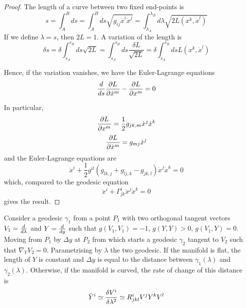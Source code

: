     \begin{proof}
        The length of a curve between two fixed end-points is 
        \begin{equation*}
            s = \int_{A}^{B} ds = \int_{A}^{B} ds \sqrt{g_{ij} \dot x^i \dot x^j} = \int_{\lambda_A}^{\lambda_B} d\lambda \sqrt{2 L(x^k, \dot x^l)}
        \end{equation*}
        If we define $\lambda = s$, then $2L = 1$. A variation of the length is 
        \begin{equation*}
            \delta s = \delta \int_{s_A}^{s_B} ds \sqrt{2L} = \int_{s_A}^{s_B} ds \frac{\delta L}{\sqrt{2L}} = \delta \int_{s_A}^{s_B} ds L(x^k, \dot x^l)
        \end{equation*}

        Hence, if the variation vanishes, we have the Euler-Lagrange equations 
        \begin{equation*}
            \frac{d}{ds} \frac{\partial L}{\partial\dot x^m} - \frac{\partial L}{\partial x^m} = 0
        \end{equation*}

        In particular, 
        \begin{equation*}
            \frac{\partial L}{\partial x^m} = \frac{1}{2} g_{jk,m} \dot x^j \dot x^k
        \end{equation*}
        \begin{equation*}
            \frac{\partial L}{\partial\dot x^m} = g_{mj} \dot x^j
        \end{equation*}
        and the Euler-Lagrange equations are 
        \begin{equation*}
            \ddot x^i + \frac{1}{2} g^{il} (g_{lk,j} + g_{lj,k} - g_{jk,l}) \dot x^j \dot x^k = 0
        \end{equation*}
        which, compared to the geodesic equation 
        \begin{equation*}
            \ddot x^i + \Gamma^i_{jk} \dot x^j \dot x^k = 0
        \end{equation*}
        gives the result.
    \end{proof}

    Consider a geodesic $\gamma_1$ from a point $P_1$ with two orthogonal tangent vectors $V_1 = \frac{d}{d\lambda}$ and $Y = \frac{d}{dy}$ such that $g(V_1,V_1) = -1$, $g(Y, Y) > 0$, $g(V_1, Y) = 0$. Moving from $P_1$ by $\Delta y$ at $P_2$ from which starts a geodesic $\gamma_2$ tangent to $V_2$ such that $\nabla_Y V_2 = 0$. Parametrising by $\lambda$ the two geodesic. If the manifold is flat, the length of $Y$ is constant and $\Delta y$ is equal to the distance between $\gamma_1(\lambda)$ and $\gamma_2(\lambda)$. Otherwise, if the manifold is curved, the rate of change of this distance is 
    \begin{equation*}
        \ddot Y^i \simeq \frac{\delta V^i}{\delta \lambda^2} \simeq R^i_{jkl} V^j Y^k V^l
    \end{equation*}
